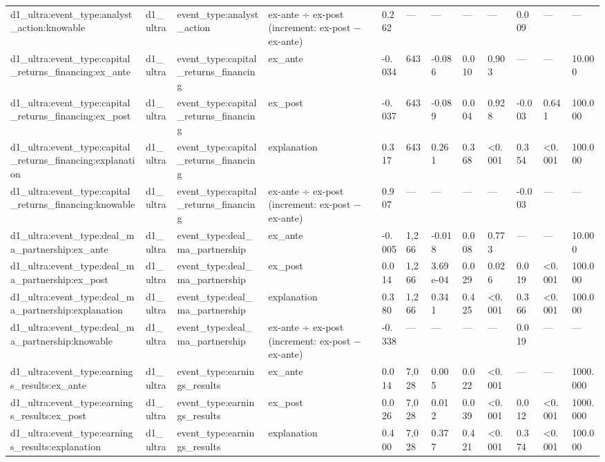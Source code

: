 \begin{tabular}{llllllllllll}
d1\_ultra:event\_type:analyst\_action:knowable & d1\_ultra & event\_type:analyst\_action & ex-ante ÷ ex-post (increment: ex-post − ex-ante) & 0.262 & — & — & — & — & 0.009 & — & — \\
d1\_ultra:event\_type:capital\_returns\_financing:ex\_ante & d1\_ultra & event\_type:capital\_returns\_financing & ex\_ante & -0.034 & 643 & -0.086 & 0.010 & 0.903 & — & — & 10.000 \\
d1\_ultra:event\_type:capital\_returns\_financing:ex\_post & d1\_ultra & event\_type:capital\_returns\_financing & ex\_post & -0.037 & 643 & -0.089 & 0.004 & 0.928 & -0.003 & 0.641 & 100.000 \\
d1\_ultra:event\_type:capital\_returns\_financing:explanation & d1\_ultra & event\_type:capital\_returns\_financing & explanation & 0.317 & 643 & 0.261 & 0.368 & <0.001 & 0.354 & <0.001 & 100.000 \\
d1\_ultra:event\_type:capital\_returns\_financing:knowable & d1\_ultra & event\_type:capital\_returns\_financing & ex-ante ÷ ex-post (increment: ex-post − ex-ante) & 0.907 & — & — & — & — & -0.003 & — & — \\
d1\_ultra:event\_type:deal\_ma\_partnership:ex\_ante & d1\_ultra & event\_type:deal\_ma\_partnership & ex\_ante & -0.005 & 1,266 & -0.018 & 0.008 & 0.773 & — & — & 10.000 \\
d1\_ultra:event\_type:deal\_ma\_partnership:ex\_post & d1\_ultra & event\_type:deal\_ma\_partnership & ex\_post & 0.014 & 1,266 & 3.69e-04 & 0.029 & 0.026 & 0.019 & <0.001 & 100.000 \\
d1\_ultra:event\_type:deal\_ma\_partnership:explanation & d1\_ultra & event\_type:deal\_ma\_partnership & explanation & 0.380 & 1,266 & 0.341 & 0.425 & <0.001 & 0.366 & <0.001 & 100.000 \\
d1\_ultra:event\_type:deal\_ma\_partnership:knowable & d1\_ultra & event\_type:deal\_ma\_partnership & ex-ante ÷ ex-post (increment: ex-post − ex-ante) & -0.338 & — & — & — & — & 0.019 & — & — \\
d1\_ultra:event\_type:earnings\_results:ex\_ante & d1\_ultra & event\_type:earnings\_results & ex\_ante & 0.014 & 7,028 & 0.005 & 0.022 & <0.001 & — & — & 1000.000 \\
d1\_ultra:event\_type:earnings\_results:ex\_post & d1\_ultra & event\_type:earnings\_results & ex\_post & 0.026 & 7,028 & 0.012 & 0.039 & <0.001 & 0.012 & <0.001 & 1000.000 \\
d1\_ultra:event\_type:earnings\_results:explanation & d1\_ultra & event\_type:earnings\_results & explanation & 0.400 & 7,028 & 0.377 & 0.421 & <0.001 & 0.374 & <0.001 & 100.000 \\

\end{tabular}
